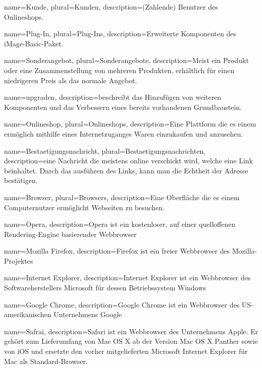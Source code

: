 \documentclass[parskip=full]{scrartcl}
\begin{document}
{
	name=Kunde,
	plural=Kunden,
	description={(Zahlende) Benutzer des Onlineshops.}
}

{
	name=Plug-In,
	plural=Plug-Ins,
	description={Erweiterte Komponenten des iMage-Basic-Paket.}
}

{
	name=Sonderangebot,
	plural=Sonderangebote,
	description={Meist ein Produkt oder eine Zusammenstellung von mehreren Produkten, erhältlich für einen niedrigeren Preis als das normale Angebot.}
}

{
	name=upgraden,
	description={beschreibt das Hinzufügen von weiteren Komponenten und das Verbessern eines bereits vorhandenen Grundbaustein.}
}

{
	name=Onlineshop,
	plural=Onlineshops,
	description={Eine Plattform die es einem ermöglich mithilfe eines Internetzuganges Waren einzukaufen und anzusehen.}
}


{
	name=Bestaetigungsnachricht,
	plural=Bestaetigungsnachrichten,
	description={eine Nachricht die meistens online verschickt wird, welche eine Link beinhaltet. Durch das ausführen des Links, kann man die Echtheit der Adresse bestätigen.}
}

{
	name=Browser,
	plural=Browsers,
	description={Eine Oberfläche die es einem \gls{Computer}nutzer ermöglicht Webseiten zu besuchen.}
}

{
	name=Opera,
	description={Opera ist ein kostenloser, auf einer quelloffenen Rendering-Engine basierender Webbrowser}
}

{
	name=Mozilla Firefox,
	description={Firefox ist ein freier Webbrowser des Mozilla-Projektes}
}

{
	name=Internet Explorer,
	description={Internet Explorer ist ein Webbrowser des Softwareherstellers Microsoft für dessen Betriebssystem Windows}
}

{
	name=Google Chrome,
	description={Google Chrome ist ein Webbrowser des US-amerikanischen Unternehmens Google}
}

{
	name=Safrai,
	description={Safari ist ein Webbrowser des Unternehmens Apple. Er gehört zum Lieferumfang von Mac OS X ab der Version Mac OS X Panther sowie von iOS und ersetzte den vorher mitgelieferten Microsoft Internet Explorer für Mac als Standard-Browser.}
}
\end{document}
